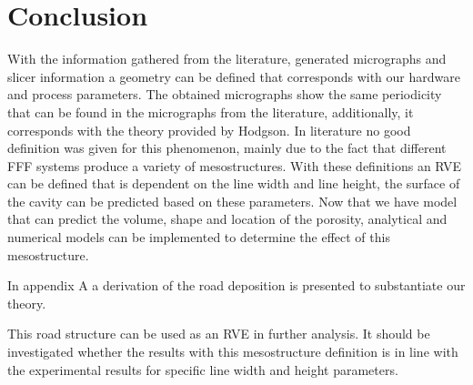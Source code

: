 \section{Conclusion}
With the information gathered from the literature, generated micrographs and slicer information a geometry can be defined that corresponds with our hardware and process parameters. The obtained micrographs show the same periodicity that can be found in the micrographs from the literature, additionally, it corresponds with the theory provided by Hodgson. In literature no good definition was given for this phenomenon, mainly due to the fact that different FFF systems produce a variety of mesostructures. 
With these definitions an RVE can be defined that is dependent on the line width and line height, the surface of the cavity can be predicted based on these parameters. Now that we have model that can predict the volume, shape and location of the porosity, analytical and numerical models can be implemented to determine the effect of this mesostructure. 

In appendix A a derivation of the road deposition is presented to substantiate our theory. 

This road structure can be used as an RVE in further analysis. It should be investigated whether the results with this mesostructure definition is in line with the experimental results for specific line width and height parameters.





